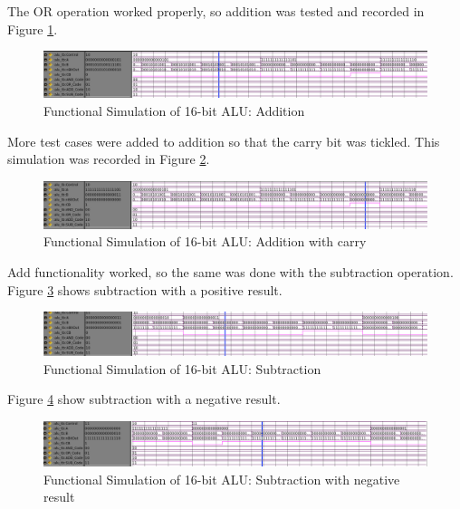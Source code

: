 \documentclass[11pt]{article}
\begin{document}
			The OR operation worked properly, so addition was tested and recorded in Figure \ref{fig:16-bit-alu-add}.
			
			\begin{figure}[H]
				\centering
				\includegraphics[width=0.7\linewidth]{"Pictures/16 Bit ALU Add"}
				\caption{Functional Simulation of 16-bit ALU: Addition}
				\label{fig:16-bit-alu-add}
			\end{figure}
		
			More test cases were added to addition so that the carry bit was tickled. This simulation was recorded in Figure \ref{fig:16-bit-alu-add-carry}.
			
			\begin{figure}[H]
				\centering
				\includegraphics[width=0.7\linewidth]{"Pictures/16 Bit ALU Add Carry"}
				\caption{Functional Simulation of 16-bit ALU: Addition with carry}
				\label{fig:16-bit-alu-add-carry}
			\end{figure}
			
			Add functionality worked, so the same was done with the subtraction operation. Figure \ref{fig:16-bit-alu-sub-pos} shows subtraction with a positive result.
			
			\begin{figure}[H]
				\centering
				\includegraphics[width=0.7\linewidth]{"Pictures/16 Bit Alu Sub Pos"}
				\caption{Functional Simulation of 16-bit ALU: Subtraction}
				\label{fig:16-bit-alu-sub-pos}
			\end{figure}
		
			Figure \ref{fig:16-bit-alu-sub-neg} show subtraction with a negative result.
			
			\begin{figure}[H]
				\centering
				\includegraphics[width=0.7\linewidth]{"Pictures/16 Bit ALU Sub Neg"}
				\caption{Functional Simulation of 16-bit ALU: Subtraction with negative result}
				\label{fig:16-bit-alu-sub-neg}
			\end{figure}
		
\end{document}
